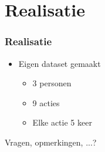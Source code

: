 \documentclass[]{beamer}
\begin{document}
	\section{Realisatie}

	\begin{frame}
		\frametitle{Realisatie}
		\begin{itemize}
			\item Eigen dataset gemaakt
			\begin{itemize}
				\item 3 personen
				\item 9 acties
				\item Elke actie 5 keer
			\end{itemize}
		\end{itemize}
	\end{frame}


	\begin{frame}
		\begin{center}
			\Huge Vragen, opmerkingen, ...?
		\end{center}
	\end{frame}
\end{document}
